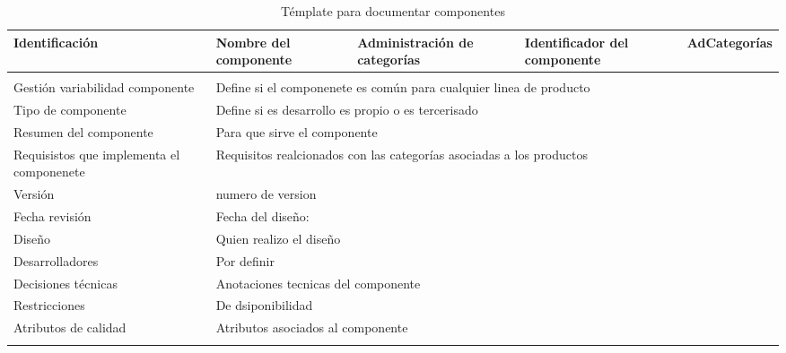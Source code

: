 \documentclass[10pt,a4paper,openany]{book}
\begin{document}
\begin{longtable}{|p{3cm}|p{3cm}|p{3cm}|p{3cm}|p{3cm}|} \hline
Identificación & Nombre del componente & Administración de categorías & Identificador del componente & AdCategorías \\[0.5ex] \hline
& & & & \\[0.5ex] \hline
Gestión variabilidad componente & \multicolumn{4}{p{12cm}|}{Define si el componenete es común para cualquier linea de producto} \\ \hline
Tipo de componente & \multicolumn{4}{p{12cm}|}{Define si es desarrollo es propio o es tercerisado} \\ \hline
Resumen del componente & \multicolumn{4}{p{12cm}|}{Para que sirve el componente} \\ \hline
Requisistos que implementa el componenete & \multicolumn{4}{p{12cm}|}{Requisitos realcionados con las categorías asociadas a los productos } \\ \hline
Versión & \multicolumn{4}{p{12cm}|}{ numero de version } \\ \hline
Fecha revisión & \multicolumn{4}{p{12cm}|}{ Fecha del diseño:} \\ \hline
Diseño & \multicolumn{4}{p{12cm}|}{Quien realizo el diseño} \\ \hline
Desarrolladores & \multicolumn{4}{p{12cm}|}{Por definir} \\ \hline
Decisiones técnicas & \multicolumn{4}{p{12cm}|}{Anotaciones tecnicas del componente} \\ \hline
Restricciones & \multicolumn{4}{p{12cm}|}{De dsiponibilidad} \\ \hline
Atributos de calidad & \multicolumn{4}{p{12cm}|}{Atributos asociados al componente} \\ \hline
\caption{Témplate para documentar componentes}
\label{table:t6}
\end{longtable}
\end{document}
